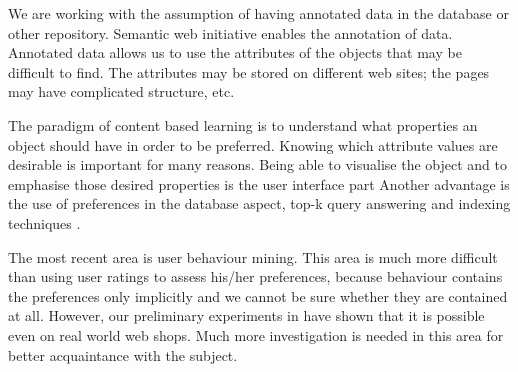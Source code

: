\documentclass[runningheads,a4paper]{llncs}
\begin{document}
 
We are working with the assumption of having annotated data in the database or other repository. Semantic web initiative enables the annotation of data. Annotated data allows us to use the attributes of the objects that may be difficult to find. The attributes may be stored on different web sites; the pages may have complicated structure, etc. 



The paradigm of content based learning is to understand what properties an object should have in order to be preferred. Knowing which attribute values are desirable is important for many reasons. Being able to visualise the object and to emphasise those desired properties is the user interface part \cite{biblio:FiserMaster} 
Another advantage is the use of preferences in the database aspect, top-k query answering and indexing techniques \cite{Fagin:2001:OAA:375551.375567}. 






The most recent area is user behaviour mining. This area is much more difficult than using user ratings to assess his/her preferences, because behaviour contains the preferences only implicitly and we cannot be sure whether they are contained at all. However, our preliminary experiments in \cite{biblio:Peska} have shown that it is possible even on real world web shops. Much more investigation is needed in this area for better acquaintance with the subject. 







\end{document}
